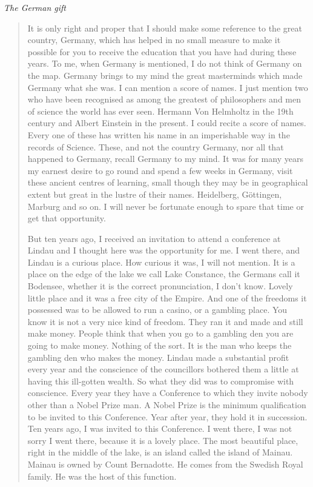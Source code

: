 \noindent
{\em The German gift}
\begin{quote}
{\fontsize{10pt}{12pt}\selectfont
It is only right and proper that I should make some reference to the great country, Germany, which has helped in no small measure to make it possible for you to receive the education that you have had during these years. To me, when Germany is mentioned, I do not think of Germany on the map. Germany brings to my mind the great masterminds which made Germany what she was. I can mention a score of names. I just mention two who have been recognised as among the greatest of philosophers and men of science the world has ever seen.
Hermann Von Helmholtz in the 19th century and Albert Einstein in the present. I could recite a score of names. Every one of these has written his name in an imperishable way in the records of Science. These, and not the country Germany, nor all that happened to Germany, recall Germany to my mind. It was for many years my earnest desire to go round and spend a few weeks in Germany, visit these ancient centres of learning, small though they may be in geographical extent but great in the lustre of their names. Heidelberg, G\"ottingen, Marburg and so on. I will never be fortunate enough to spare that time or get that opportunity.

But ten years ago, I received an invitation to attend a conference at Lindau and I thought here was the opportunity for me. I went there, and Lindau is a curious place. How curious it was, I will not mention. It is a place on the edge of the lake we call Lake Constance, the Germans call it Bodensee, whether it is the correct pronunciation, I don't know. Lovely little place and it was a free city of the Empire. And one of the freedoms it possessed was to be allowed to run a casino, or a gambling place. You know it is not a very nice kind of freedom. They ran it and made and still make money. People think that when you go to a gambling den you are going to make money. Nothing of the sort. It is the man who keeps the gambling den who makes the money. Lindau made a substantial profit every year and the conscience of the councillors bothered them a little at having this ill-gotten wealth. So what they did was to compromise with conscience. Every year they have a Conference to which they invite nobody other than a Nobel Prize man. A Nobel Prize is the minimum qualification to be invited to this Conference. Year after year, they hold it in succession. Ten years ago, I was invited to this Conference. I went there, I was not sorry I went there, because it is a lovely place. The most beautiful place, right in the middle of the lake, is an island called the island of Mainau. Mainau is owned by Count Bernadotte. He comes from the Swedish Royal family. He was the host of this function.

}
\end{quote}

